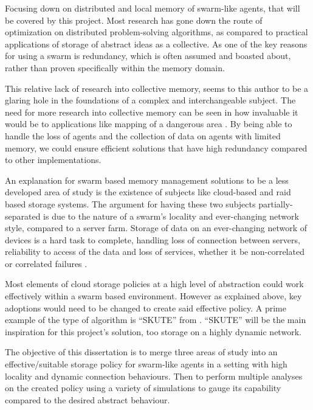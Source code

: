 \documentclass{UoYCSproject}
\begin{document}
Focusing down on distributed and local memory of swarm-like agents, that will be covered by this project. 
Most research has gone down the route of optimization on distributed problem-solving algorithms, as compared to practical applications of storage of abstract ideas as a collective. 
As one of the key reasons for using a swarm is redundancy, which is often assumed and boasted about, rather than proven specifically within the memory domain.

This relative lack of research into collective memory, seems to this author to be a glaring hole in the foundations of a complex and interchangeable subject. 
The need for more research into collective memory can be seen in how invaluable it would be to applications like mapping of a dangerous area \cite{Cognitive maps mine detection}. 
By being able to handle the loss of agents and the collection of data on agents with limited memory, we could ensure efficient solutions that have high redundancy compared to other implementations.

An explanation for swarm based memory management solutions to be a less developed area of study is the existence of subjects like cloud-based and raid based storage systems. 
The argument for having these two subjects partially-separated is due to the nature of a swarm's locality and ever-changing network style, compared to a server farm. 
Storage of data on an ever-changing network of devices is a hard task to complete, handling loss of connection between servers, reliability to access of the data and loss of services, whether it be non-correlated or correlated failures \cite{Avalability storage}.

Most elements of cloud storage policies at a high level of abstraction could work effectively within a swarm based environment. 
However as explained above, key adoptions would need to be changed to create said effective policy. 
A prime example of the type of algorithm is “SKUTE” from \cite{Distributed Storage}.
“SKUTE” will be the main inspiration for this project's solution, too storage on a highly dynamic network.

The objective of this dissertation is to merge three areas of study into an effective/suitable storage policy for swarm-like agents in a setting with high locality and dynamic connection behaviours. 
Then to perform multiple analyses on the created policy using a variety of simulations to gauge its capability compared to the desired abstract behaviour.
\end{document}
